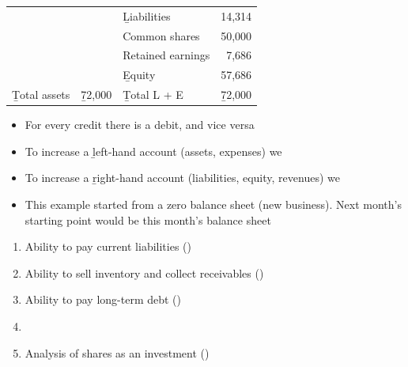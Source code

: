 \begin{example}
\begin{center}
\begin{minipage}[t]{0.55\linewidth}
\begin{tabular}[t]{lr|lr}
            & & \b{Liabilities} & 14,314 \\
            & & Common shares & 50,000 \\
            & & Retained earnings & 7,686 \\
            & & \b{Equity} & 57,686 \\
            \midrule
            \b{Total assets} & \b{72,000} & \b{Total L + E} & \b{72,000} \\
            \bottomrule
        \end{tabular}
    \end{minipage}
    \end{center}
\end{example}

\begin{itemize}
    \item For every credit there is a debit, and vice versa
    \item To increase a \b{left-hand} account (assets, expenses) we 
    \item To increase a \b{right-hand} account (liabilities, equity, revenues) we 
    \item This example started from a zero balance sheet (new business). Next month's starting point would be this month's  balance sheet
\end{itemize}


\begin{enumerate}
    \item Ability to pay current liabilities ()
    \item Ability to sell inventory and collect receivables ()
    \item Ability to pay long-term debt ()
    \item {}
    \item Analysis of shares as an investment ()
\end{enumerate}

